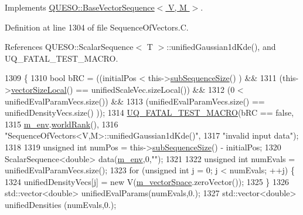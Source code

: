 Implements \hyperlink{class_q_u_e_s_o_1_1_base_vector_sequence_aa799ae2fde5edc96939990925d7be9ac}{Q\-U\-E\-S\-O\-::\-Base\-Vector\-Sequence$<$ V, M $>$}.



Definition at line 1304 of file Sequence\-Of\-Vectors.\-C.



References Q\-U\-E\-S\-O\-::\-Scalar\-Sequence$<$ T $>$\-::unified\-Gaussian1d\-Kde(), and U\-Q\-\_\-\-F\-A\-T\-A\-L\-\_\-\-T\-E\-S\-T\-\_\-\-M\-A\-C\-R\-O.


\begin{DoxyCode}
1309 \{
1310   \textcolor{keywordtype}{bool} bRC = ((initialPos                  <  this->\hyperlink{class_q_u_e_s_o_1_1_sequence_of_vectors_a0224bd3e961d86af5d2886301c0c2b86}{subSequenceSize}()    ) &&
1311               (this->\hyperlink{class_q_u_e_s_o_1_1_base_vector_sequence_a2fefedf9e5b90f22881103b3f92555f6}{vectorSizeLocal}()     == unifiedScaleVec.sizeLocal()) &&
1312               (0                           <  unifiedEvalParamVecs.size()) &&
1313               (unifiedEvalParamVecs.size() == unifiedDensityVecs.size()  ));
1314   \hyperlink{_defines_8h_a56d63d18d0a6d45757de47fcc06f574d}{UQ\_FATAL\_TEST\_MACRO}(bRC == \textcolor{keyword}{false},
1315                       \hyperlink{class_q_u_e_s_o_1_1_base_vector_sequence_a8e8824d2a63c5a43bcc6473e3a0491e8}{m\_env}.\hyperlink{class_q_u_e_s_o_1_1_base_environment_a78b57112bbd0e6dd0e8afec00b40ffa7}{worldRank}(),
1316                       \textcolor{stringliteral}{"SequenceOfVectors<V,M>::unifiedGaussian1dKde()"},
1317                       \textcolor{stringliteral}{"invalid input data"});
1318 
1319   \textcolor{keywordtype}{unsigned} \textcolor{keywordtype}{int} numPos = this->\hyperlink{class_q_u_e_s_o_1_1_sequence_of_vectors_a0224bd3e961d86af5d2886301c0c2b86}{subSequenceSize}() - initialPos;
1320   ScalarSequence<double> data(\hyperlink{class_q_u_e_s_o_1_1_base_vector_sequence_a8e8824d2a63c5a43bcc6473e3a0491e8}{m\_env},0,\textcolor{stringliteral}{""});
1321 
1322   \textcolor{keywordtype}{unsigned} \textcolor{keywordtype}{int} numEvals = unifiedEvalParamVecs.size();
1323   \textcolor{keywordflow}{for} (\textcolor{keywordtype}{unsigned} \textcolor{keywordtype}{int} j = 0; j < numEvals; ++j) \{
1324     unifiedDensityVecs[j] = \textcolor{keyword}{new} V(\hyperlink{class_q_u_e_s_o_1_1_base_vector_sequence_a4bd171e39ed050ff105c808336f35198}{m\_vectorSpace}.zeroVector());
1325   \}
1326   std::vector<double> unifiedEvalParams(numEvals,0.);
1327   std::vector<double> unifiedDensities (numEvals,0.);

\end{DoxyCode}
